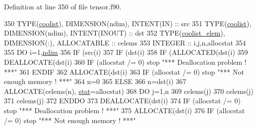 Definition at line 350 of file tensor.\+f90.


\begin{DoxyCode}
350     \textcolor{keywordtype}{TYPE}(\hyperlink{structtensor_1_1coolist}{coolist}), \textcolor{keywordtype}{DIMENSION(ndim)}, \textcolor{keywordtype}{INTENT(IN)} :: src
351     \textcolor{keywordtype}{TYPE}(\hyperlink{structtensor_1_1coolist}{coolist}), \textcolor{keywordtype}{DIMENSION(ndim)}, \textcolor{keywordtype}{INTENT(INOUT)} :: dst
352     \textcolor{keywordtype}{TYPE}(\hyperlink{structtensor_1_1coolist__elem}{coolist\_elem}), \textcolor{keywordtype}{DIMENSION(:)}, \textcolor{keywordtype}{ALLOCATABLE} :: celems
353     \textcolor{keywordtype}{INTEGER} :: i,j,n,allocstat
354 
355     \textcolor{keywordflow}{DO} i=1,\hyperlink{namespaceparams_a2323fe1773f086e20c14f266351c482b}{ndim}
356        \textcolor{keywordflow}{IF} (src(i)%
357           \textcolor{keywordflow}{IF} (dst(i)%
358              \textcolor{keywordflow}{IF} (\textcolor{keyword}{ALLOCATED}(dst(i)%
359                 \textcolor{keyword}{DEALLOCATE}(dst(i)%
360                 \textcolor{keywordflow}{IF} (allocstat /= 0) stop \textcolor{stringliteral}{"*** Deallocation problem ! ***"}
361 \textcolor{keywordflow}{             ENDIF}
362              \textcolor{keyword}{ALLOCATE}(dst(i)%
363              \textcolor{keywordflow}{IF} (allocstat /= 0) stop \textcolor{stringliteral}{"*** Not enough memory ! ***"}
364              n=0
365           \textcolor{keywordflow}{ELSE}
366              n=dst(i)%
367              \textcolor{keyword}{ALLOCATE}(celems(n), \hyperlink{namespacestat}{stat}=allocstat)
368              \textcolor{keywordflow}{DO} j=1,n
369                 celems(j)%
370                 celems(j)%
371                 celems(j)%
372 \textcolor{keywordflow}{             ENDDO}
373              \textcolor{keyword}{DEALLOCATE}(dst(i)%
374              \textcolor{keywordflow}{IF} (allocstat /= 0) stop \textcolor{stringliteral}{"*** Deallocation problem ! ***"}
375              \textcolor{keyword}{ALLOCATE}(dst(i)%
376              \textcolor{keywordflow}{IF} (allocstat /= 0) stop \textcolor{stringliteral}{"*** Not enough memory ! ***"}

\end{DoxyCode}
